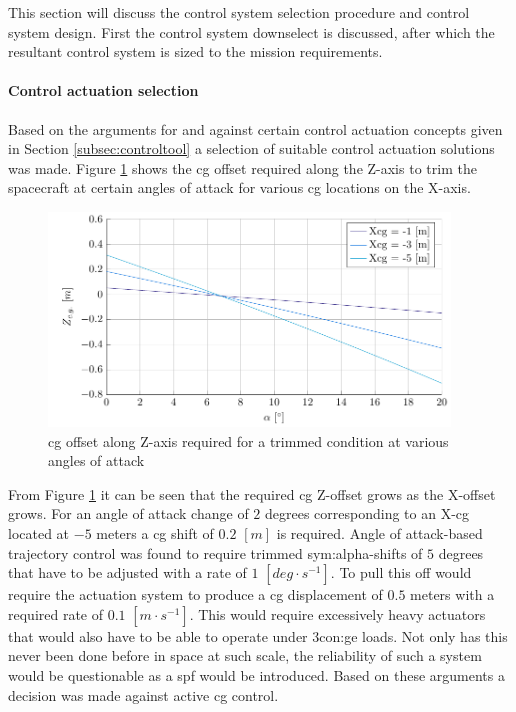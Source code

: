 This section will discuss the control system selection procedure and control system design. First the control system downselect is discussed, after which the resultant control system is sized to the mission requirements.
\paragraph{Control actuation selection}
Based on the arguments for and against certain control actuation concepts given in Section \ref{subsec:controltool} a selection of suitable control actuation solutions was made. Figure \ref{fig:cgoffset} shows the \gls{cg} offset required along the Z-axis to trim the spacecraft at certain angles of attack for various \gls{cg} locations on the X-axis. 
\begin{figure}[h]
	\centering
	\includegraphics[width=0.95\textwidth]{./Figure/control/moment}
	\caption[\acrlong{cg} offset along Z-axis required for a trimmed condition at various angles of attack]{\gls{cg} offset along Z-axis required for a trimmed condition at various angles of attack}
	\label{fig:cgoffset}
\end{figure}
From Figure \ref{fig:cgoffset} it can be seen that the required \gls{cg} Z-offset grows as the X-offset grows. For an angle of attack change of $2$ degrees corresponding to an X-\gls{cg} located at $-5$ meters a \gls{cg} shift of $0.2$ $[m]$ is required. Angle of attack-based trajectory control was found to require trimmed \gls{sym:alpha}-shifts of $5$ degrees that have to be adjusted with a rate of $1$ $[deg \cdot s^{-1}]$. To pull this off would require the actuation system to produce a \gls{cg} displacement of $0.5$ meters with a required rate of $0.1$ $[m \cdot s^{-1}]$. This would require excessively heavy actuators that would also have to be able to operate under 3\gls{con:ge} loads. Not only has this never been done before in space at such scale, the reliability of such a system would be questionable as a \gls{spf} would be introduced. Based on these arguments a decision was made against active \gls{cg} control.

